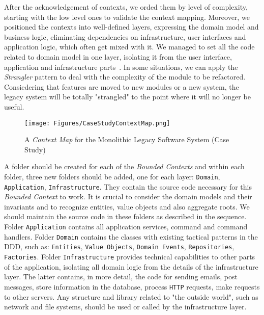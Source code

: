 \documentclass[a4paper,twoside]{article}
\begin{document}
After the acknowledgement of contexts, we orded them by level of complexity, starting with the low level ones to validate the context mapping. Moreover, we positioned the contexts into well-defined layers, expressing the domain model and business logic, eliminating dependencies on infrastructure, user interfaces and application logic, which often get mixed with it. We managed to set all the code related to domain model in one layer, isolating it from the user interface, application and infrastructure parts~\cite{evans2004domain}. In some situations, we can apply the \textit{Strangler} pattern \cite{taibi2017processes} to deal with the complexity of the module to be refactored. Consiedering that features are moved to new modules or a new system, the legacy system will be totally "strangled" to the point where it will no longer be useful.

\begin{figure}
\centering
\texttt{[image: Figures/CaseStudyContextMap.png]}
\caption{A \textit{Context Map} for the Monolithic Legacy Software System (Case Study) \cite{henriqueITNG2019expReport}}
\label{fig:CaseStudyContextMap}
\end{figure}

A folder should be created for each of the \textit{Bounded Contexts} and within each folder, three new folders should be added, one for each layer: \texttt{Domain}, \texttt{Application}, \texttt{Infrastructure}. They contain the source code necessary for this \textit{Bounded Context} to work. It is crucial to consider the domain models and their invariants and to recognize entities, value objects and also aggregate roots. We should maintain the source code in these folders as described in the sequence. Folder \texttt{Application} contains all application services, command and command handlers. Folder \texttt{Domain} contains the classes with existing tactical patterns in the DDD, such as: \texttt{Entities}, \texttt{Value Objects}, \texttt{Domain Events}, \texttt{Repositories}, \texttt{Factories}. Folder \texttt{Infrastructure} provides technical capabilities to other parts of the application, isolating all domain logic from the details of the infrastructure layer. The latter contains, in more detail, the code for sending emails, post messages, store information in the database, process \texttt{HTTP} requests, make requests to other servers. Any structure and library related to "the outside world", such as network and file systems, should be used or called by the infrastructure layer. 
\end{document}
